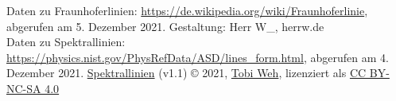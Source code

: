 \documentclass{article}
\begin{document}



\vfill
Daten zu Fraunhoferlinien: \url{https://de.wikipedia.org/wiki/Fraunhoferlinie},
   abgerufen am 5. Dezember 2021.
\hfill
Gestaltung: Herr W\_, herrw.de\\
Daten zu Spektrallinien: \url{https://physics.nist.gov/PhysRefData/ASD/lines_form.html},
   abgerufen am 4. Dezember 2021.
\hfill
\href{https://github.com/tweh/spektrallinien}{Spektrallinien} (v1.1) © 2021, \href{https://herrw.de}{Tobi Weh}, lizenziert als \href{http://creativecommons.org/licenses/by-nc-sa/4.0/}
   {CC BY-NC-SA 4.0} \raisebox{0.17ex}{\ccbyncsa}
\end{document}
